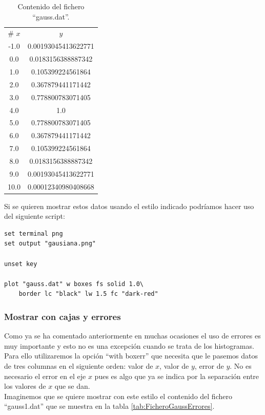 \documentclass[11pt,a4paper,twoside,pdf]{article}
\numberwithin{equation}{section}
\begin{document}
\begin{table}[h]
	\centering
	\caption{Contenido del fichero ``gauss.dat''.}
	\label{tab:FicheroGauss}
	\begin{tabular}{cc}
	\# $x$ & $y$ \\
	-1.0 & 0.00193045413622771 \\
	0.0 & 0.0183156388887342 \\
	1.0 & 0.105399224561864 \\
	2.0 & 0.367879441171442 \\
	3.0 & 0.778800783071405 \\
	4.0 & 1.0 \\
	5.0 & 0.778800783071405 \\
	6.0 & 0.367879441171442 \\
	7.0 & 0.105399224561864 \\
	8.0 & 0.0183156388887342 \\
	9.0 & 0.00193045413622771 \\
	10.0 & 0.00012340980408668
	\end{tabular}
\end{table}

Si se quieren mostrar estos datos usando el estilo indicado podríamos hacer uso del siguiente script:

\begin{lstlisting}[language=Gnuplot]
set terminal png
set output "gausiana.png"

unset key

plot "gauss.dat" w boxes fs solid 1.0\
	border lc "black" lw 1.5 fc "dark-red"
\end{lstlisting}

\newpage

\subsubsection{Mostrar con cajas y errores}

Como ya se ha comentado anteriormente en muchas ocasiones el uso de errores es muy importante y esto no es una excepción cuando se trata de los histogramas. Para ello utilizaremos la opción ``with boxerr'' que necesita que le pasemos datos de tres columnas en el siguiente orden: valor de $x$, valor de $y$, error de $y$. No es necesario el error en el eje $x$ pues es algo que ya se indica por la separación entre los valores de $x$ que se dan.\\

Imaginemos que se quiere mostrar con este estilo el contenido del fichero ``gauss1.dat'' que se muestra en la tabla \ref{tab:FicheroGaussErrores}.
\end{document}
